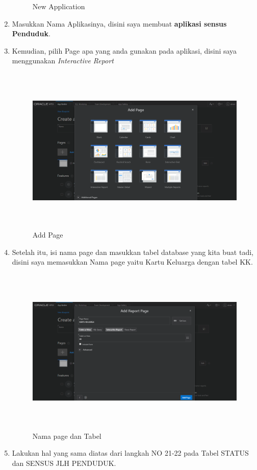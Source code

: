 \begin{enumerate}
\begin{figure}[!htbp]
\caption{New Application}
\label{penanda}
\end{figure}
\item Masukkan Nama Aplikasinya, disini saya membuat \textbf{aplikasi sensus Penduduk}.
\item Kemudian, pilih Page apa yang anda gunakan pada aplikasi, disini saya menggunakan \textit{Interactive Report}
\begin{figure}[!htbp]
\centering
\includegraphics[width=13cm,height=8cm]{figures/H4.PNG}
\caption{Add Page}
\label{penanda}
\end{figure}
\item  Setelah itu, isi nama page dan masukkan tabel database yang kita buat tadi, disini saya memasukkan Nama page yaitu Kartu Keluarga dengan tabel KK.
\begin{figure}[!htbp]
\centering
\includegraphics[width=13cm,height=8cm]{figures/H5.PNG}
\caption{Nama page dan Tabel}
\label{penanda}
\end{figure}
\item Lakukan hal yang sama diatas dari langkah NO 21-22 pada Tabel STATUS dan SENSUS JLH PENDUDUK.

\end{enumerate}
